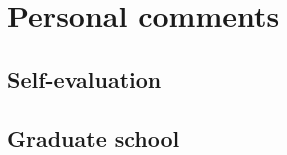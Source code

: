 \section{Personal comments}
\label{sec:personal}


\subsection{Self-evaluation}
\label{sec:evaluation}


\subsection{Graduate school}
\label{sec:graduate school}

